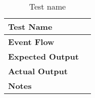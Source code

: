 \begin{table}[h]	
	\centering
	\def\arraystretch{1.5}
	\begin{tabular}{|m{7cm}|m{7cm}|}
		\hline
		\textbf{Test Name}            &    \\ \hline
		\textbf{Event Flow}             &   \\ \hline
		\textbf{Expected Output}  &     \\ \hline
		\textbf{Actual Output}       &     \\ \hline
		\textbf{Notes} & \\ \hline
	\end{tabular}
	\caption{Test name}
\end{table}